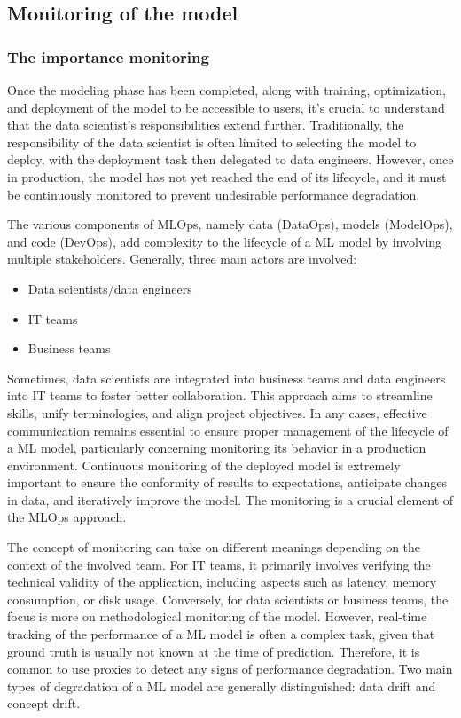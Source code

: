 \subsection{Monitoring of the model}

\subsubsection{The importance monitoring}

Once the modeling phase has been completed, along with training, optimization, and deployment of the model to be accessible to users, it's crucial to understand that the data scientist's responsibilities extend further. Traditionally, the responsibility of the data scientist is often limited to selecting the model to deploy, with the deployment task then delegated to data engineers. However, once in production, the model has not yet reached the end of its lifecycle, and it must be continuously monitored to prevent undesirable performance degradation.

The various components of MLOps, namely data (DataOps), models (ModelOps), and code (DevOps), add complexity to the lifecycle of a ML model by involving multiple stakeholders. Generally, three main actors are involved:

\begin{itemize}
    \item Data scientists/data engineers
    \item IT teams
    \item Business teams
\end{itemize}

Sometimes, data scientists are integrated into business teams and data engineers into IT teams to foster better collaboration. This approach aims to streamline skills, unify terminologies, and align project objectives. In any cases, effective communication remains essential to ensure proper management of the lifecycle of a ML model, particularly concerning monitoring its behavior in a production environment. Continuous monitoring of the deployed model is extremely important to ensure the conformity of results to expectations, anticipate changes in data, and iteratively improve the model. The monitoring is a crucial element of the MLOps approach.

The concept of monitoring can take on different meanings depending on the context of the involved team. For IT teams, it primarily involves verifying the technical validity of the application, including aspects such as latency, memory consumption, or disk usage. Conversely, for data scientists or business teams, the focus is more on methodological monitoring of the model. However, real-time tracking of the performance of a ML model is often a complex task, given that ground truth is usually not known at the time of prediction. Therefore, it is common to use proxies to detect any signs of performance degradation. Two main types of degradation of a ML model are generally distinguished: data drift and concept drift.

